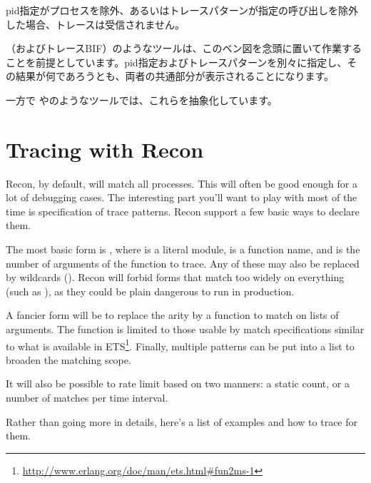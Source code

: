 pid指定がプロセスを除外、あるいはトレースパターンが指定の呼び出しを除外した場合、トレースは受信されません。

（およびトレースBIF）のようなツールは、このベン図を念頭に置いて作業することを前提としています。pid指定およびトレースパターンを別々に指定し、その結果が何であろうとも、両者の共通部分が表示されることになります。

\FloatBarrier
一方で やのようなツールでは、これらを抽象化しています。

\section{Tracing with Recon}

Recon, by default, will match all processes. This will often be good enough for a lot of debugging cases. The interesting part you'll want to play with most of the time is specification of trace patterns. Recon support a few basic ways to declare them. 

The most basic form is , where  is a literal module,  is a function name, and  is the number of arguments of the function to trace. Any of these may also be replaced by wildcards (). Recon will forbid forms that match too widely on everything (such as ), as they could be plain dangerous to run in production.

A fancier form will be to replace the arity by a function to match on lists of arguments. The function is limited to those usable by match specifications similar to what is available in ETS\footnote{\href{http://www.erlang.org/doc/man/ets.html\#fun2ms-1}{http://www.erlang.org/doc/man/ets.html\#fun2ms-1}}. Finally, multiple patterns can be put into a list to broaden the matching scope.

It will also be possible to rate limit based on two manners: a static count, or a number of matches per time interval.

Rather than going more in details, here's a list of examples and how to trace for them.

